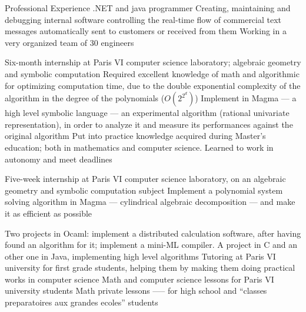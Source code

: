 \begin{rubric}{\color{ForestGreen} Professional Experience}
  .NET and java programmer
  Creating, maintaining and debugging internal software controlling the
  real-time flow of commercial
  text messages automatically sent to customers or received from them
  Working in a very organized team of 30 engineers


 Six-month internship at Paris VI computer science laboratory;
 algebraic geometry and symbolic computation
  Required excellent knowledge of math and algorithmic for optimizing
  computation time, due to the double exponential complexity of the
  algorithm in the degree of the polynomials ($O(2^{2^d})$)
  \entry* Implement in Magma --- a high level symbolic language ---
  an experimental
  algorithm (rational univariate representation), in order to analyze it and
  measure its performances against the original algorithm
  \entry* Put into practice knowledge acquired during Master’s education;
  both in mathematics and computer science. Learned to work in autonomy
  and meet deadlines

  Five-week internship at Paris VI computer science laboratory,
  on an algebraic geometry and symbolic computation subject
  Implement a polynomial system solving algorithm in Magma --- cylindrical algebraic decomposition --- and make it
  as efficient as possible

  Two projects in Ocaml: implement a distributed calculation software,
  after having found an algorithm for it; implement a mini-ML compiler. A
  project in C and an other one in Java, implementing high level
  algorithms
  \entry*
  Tutoring at Paris VI university for first grade students, helping them by
  making them doing practical works in computer science
  \entry*
  Math and computer science lessons for Paris VI university students
  \entry*
  Math private lessons —-- for high school and
  ``classes preparatoires aux grandes ecoles'' students

\end{rubric}
